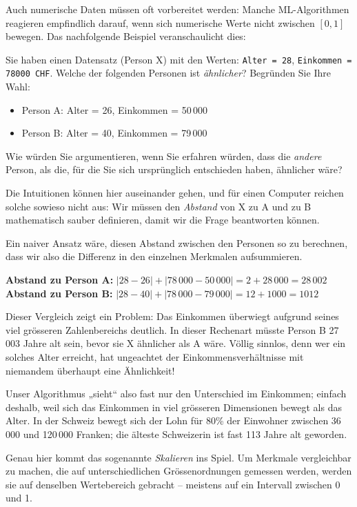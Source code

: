 \begin{lpu}
Auch numerische Daten m\"ussen oft vorbereitet werden: Manche ML-Algorithmen reagieren empfindlich darauf, wenn sich numerische Werte nicht zwischen $[0,1]$ bewegen. Das nachfolgende Beispiel veranschaulicht dies:

\begin{aufgabe}{3}
Sie haben einen Datensatz (Person X) mit den Werten: \texttt{Alter = 28}, \texttt{Einkommen = 78000 CHF}. Welche der folgenden Personen ist \textit{ähnlicher}? Begründen Sie Ihre Wahl:
\begin{itemize}
  \item Person A: Alter = 26, Einkommen = 50\,000
  \item Person B: Alter = 40, Einkommen = 79\,000
\end{itemize}
Wie würden Sie argumentieren, wenn Sie erfahren würden, dass die \textit{andere} Person, als die, für die Sie sich ursprünglich entschieden haben, ähnlicher wäre?
\end{aufgabe}

Die Intuitionen können hier auseinander gehen, und für einen Computer reichen solche sowieso nicht aus: Wir müssen den \textit{Abstand} von X zu A und zu B mathematisch sauber definieren, damit wir die Frage beantworten können.

Ein naiver Ansatz wäre, diesen Abstand zwischen den Personen so zu berechnen, dass wir also die Differenz in den einzelnen Merkmalen aufsummieren.

\textbf{Abstand zu Person A:} $|28 - 26| + |78\,000 - 50\,000| = 2 + 28\,000 = 28\,002$ \\
\textbf{Abstand zu Person B:} $|28 - 40| + |78\,000 - 79\,000| = 12 + 1000 = 1012$

Dieser Vergleich zeigt ein Problem: Das Einkommen überwiegt aufgrund seines viel grösseren Zahlenbereichs deutlich. In dieser Rechenart müsste Person B 27\,003 Jahre alt sein, bevor sie X ähnlicher als A wäre. Völlig sinnlos, denn wer ein solches Alter erreicht, hat ungeachtet der Einkommensverhältnisse mit niemandem überhaupt eine Ähnlichkeit!

Unser Algorithmus „sieht“ also fast nur den Unterschied im Einkommen; einfach deshalb, weil sich das Einkommen in viel grösseren Dimensionen bewegt als das Alter. In der Schweiz bewegt sich der Lohn für 80\% der Einwohner zwischen 36\,000 und 120\,000 Franken; die älteste Schweizerin ist fast 113 Jahre alt geworden.

Genau hier kommt das sogenannte \emph{Skalieren} ins Spiel. Um  Merkmale vergleichbar zu machen, die auf unterschiedlichen Grössenordnungen gemessen werden, werden sie auf denselben Wertebereich gebracht – meistens auf ein Intervall zwischen 0 und 1. 


\end{lpu}
